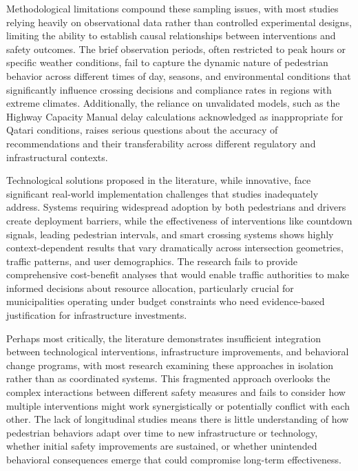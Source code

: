 \documentclass[a4paper, 12pt]{report}
\begin{document}
Methodological limitations compound these sampling issues, with most studies relying heavily on observational data rather than controlled experimental designs, limiting the ability to establish causal relationships between interventions and safety outcomes. The brief observation periods, often restricted to peak hours or specific weather conditions, fail to capture the dynamic nature of pedestrian behavior across different times of day, seasons, and environmental conditions that significantly influence crossing decisions and compliance rates in regions with extreme climates. Additionally, the reliance on unvalidated models, such as the Highway Capacity Manual delay calculations acknowledged as inappropriate for Qatari conditions, raises serious questions about the accuracy of recommendations and their transferability across different regulatory and infrastructural contexts.

Technological solutions proposed in the literature, while innovative, face significant real-world implementation challenges that studies inadequately address. Systems requiring widespread adoption by both pedestrians and drivers create deployment barriers, while the effectiveness of interventions like countdown signals, leading pedestrian intervals, and smart crossing systems shows highly context-dependent results that vary dramatically across intersection geometries, traffic patterns, and user demographics. The research fails to provide comprehensive cost-benefit analyses that would enable traffic authorities to make informed decisions about resource allocation, particularly crucial for municipalities operating under budget constraints who need evidence-based justification for infrastructure investments.

Perhaps most critically, the literature demonstrates insufficient integration between technological interventions, infrastructure improvements, and behavioral change programs, with most research examining these approaches in isolation rather than as coordinated systems. This fragmented approach overlooks the complex interactions between different safety measures and fails to consider how multiple interventions might work synergistically or potentially conflict with each other. The lack of longitudinal studies means there is little understanding of how pedestrian behaviors adapt over time to new infrastructure or technology, whether initial safety improvements are sustained, or whether unintended behavioral consequences emerge that could compromise long-term effectiveness.
\end{document}
